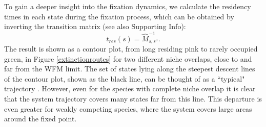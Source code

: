 \documentclass[a4paper,10pt]{article}
\numberwithin{equation}{section} %
\begin{document}
To gain a deeper insight into the fixation dynamics, we calculate the residency times in each state during the fixation process, which can be obtained by inverting the transition matrix \cite{Grinstead2003} (see also Supporting Info):
\begin{equation} \label{residence-time}
 t_{res}(s) = \hat{M}^{-1}_{s,s^0}.
\end{equation}
The result is shown as a contour plot, from long residing pink to rarely occupied green, in Figure \ref{extinctionroutes} for two different niche overlaps, close to and far from the WFM limit. 
The set of states lying along the steepest descent lines of the contour plot, shown as the black line, can be thought of as a ``typical" trajectory \cite{Gabel2013,Matkowsky1984,Kessler2007}. 
However, even for the species with complete niche overlap it is clear that the system trajectory covers many states far from this line. %
This departure is even greater for weakly competing species, where the system covers large areas around the fixed point. %
\end{document}
